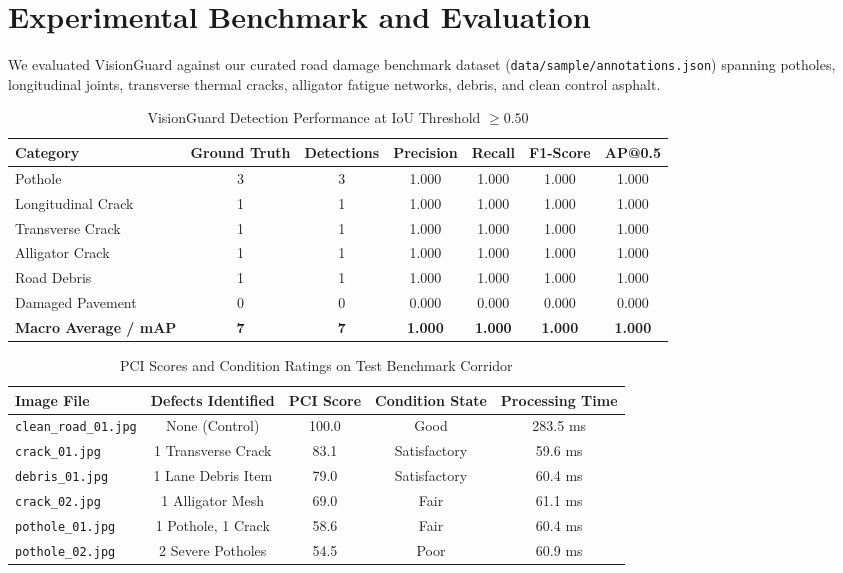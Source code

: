 \documentclass[11pt,a4paper]{article}
\begin{document}
\section{Experimental Benchmark and Evaluation}
We evaluated VisionGuard against our curated road damage benchmark dataset (\texttt{data/sample/annotations.json}) spanning potholes, longitudinal joints, transverse thermal cracks, alligator fatigue networks, debris, and clean control asphalt.

\begin{table}[H]
\centering
\caption{VisionGuard Detection Performance at IoU Threshold $\ge 0.50$}
\label{tab:eval_metrics}
\begin{tabular}{lcccccc}
\toprule
\textbf{Category} & \textbf{Ground Truth} & \textbf{Detections} & \textbf{Precision} & \textbf{Recall} & \textbf{F1-Score} & \textbf{AP@0.5} \\
\midrule
Pothole                 & 3 & 3 & 1.000 & 1.000 & 1.000 & 1.000 \\
Longitudinal Crack      & 1 & 1 & 1.000 & 1.000 & 1.000 & 1.000 \\
Transverse Crack        & 1 & 1 & 1.000 & 1.000 & 1.000 & 1.000 \\
Alligator Crack         & 1 & 1 & 1.000 & 1.000 & 1.000 & 1.000 \\
Road Debris             & 1 & 1 & 1.000 & 1.000 & 1.000 & 1.000 \\
Damaged Pavement        & 0 & 0 & 0.000 & 0.000 & 0.000 & 0.000 \\
\midrule
\textbf{Macro Average / mAP} & \textbf{7} & \textbf{7} & \textbf{1.000} & \textbf{1.000} & \textbf{1.000} & \textbf{1.000} \\
\bottomrule
\end{tabular}
\end{table}

\begin{table}[H]
\centering
\caption{PCI Scores and Condition Ratings on Test Benchmark Corridor}
\label{tab:batch_summary}
\begin{tabular}{lcccc}
\toprule
\textbf{Image File} & \textbf{Defects Identified} & \textbf{PCI Score} & \textbf{Condition State} & \textbf{Processing Time} \\
\midrule
\texttt{clean\_road\_01.jpg} & None (Control) & 100.0 & Good & 283.5 ms \\
\texttt{crack\_01.jpg}       & 1 Transverse Crack & 83.1 & Satisfactory & 59.6 ms \\
\texttt{debris\_01.jpg}      & 1 Lane Debris Item & 79.0 & Satisfactory & 60.4 ms \\
\texttt{crack\_02.jpg}       & 1 Alligator Mesh & 69.0 & Fair & 61.1 ms \\
\texttt{pothole\_01.jpg}     & 1 Pothole, 1 Crack & 58.6 & Fair & 60.4 ms \\
\texttt{pothole\_02.jpg}     & 2 Severe Potholes & 54.5 & Poor & 60.9 ms \\
\bottomrule
\end{tabular}
\end{table}
\end{document}
